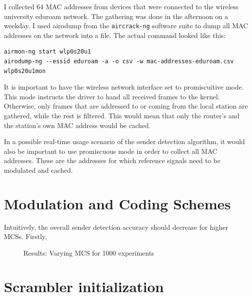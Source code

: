 I collected 64 MAC addresses from devices that were connected to the wireless university eduroam network. The gathering was done in the afternoon on a weekday. I used airodump from the \texttt{aircrack-ng} software suite to dump all MAC addresses on the network into a file. The actual command looked like this:

\begin{lstlisting}[captionpos=b,caption={Capture Real-World MAC Addresses},label=lst:airodump]
airmon-ng start wlp0s20u1
airodump-ng --essid eduroam -a -o csv -w mac-addresses-eduroam.csv wlp0s20u1mon
\end{lstlisting}

It is important to have the wireless network interface set to promiscuitive mode. This mode instructs the driver to hand all received frames to the kernel. Otherwise, only frames that are addressed to or coming from the local station are gathered, while the rest is filtered. This would mean that only the router's and the station's own MAC address would be cached.

In a possible real-time usage scenario of the sender detection algorithm, it would also be important to use promiscuous mode in order to collect all MAC addresses. These are the addresses for which reference signals need to be modulated and cached.



\section{Modulation and Coding Schemes}

Intuitively, the overall sender detection accuracy should decrease for higher \glspl{MCS}. Firstly,

\begin{figure}[H]
	\centering
	\setlength\figureheight{5cm}
	\setlength{}
	
	\caption{Results: Varying MCS for 1000 experiments}
	\label{fig:vary_mcs}
\end{figure}



\section{Scrambler initialization}\label{sec:ex-scrambler}

